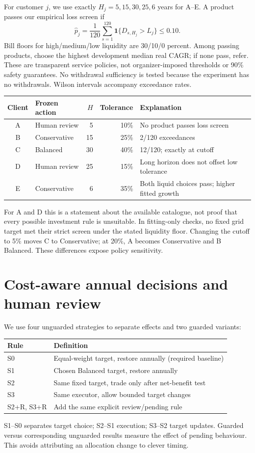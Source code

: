 \documentclass[11pt,a4paper]{article}
\begin{document}
For customer $j$, we use exactly $H_j=5,15,30,25,6$ years for A--E. A product
passes our empirical loss screen if
\begin{equation}
 \widehat p_j=\frac{1}{120}\sum_{s=1}^{120}
 \mathbf1\{D_{s,H_j}>L_j\}\leq0.10.
\end{equation}
Bill floors for high/medium/low liquidity are 30/10/0 percent. Among passing
products, choose the highest development median real CAGR; if none pass, refer.
These are transparent service policies, not organizer-imposed thresholds or
90\% safety guarantees. No withdrawal sufficiency is tested because the
experiment has no withdrawals. Wilson intervals accompany exceedance rates.

\begin{center}
\begin{tabular}{clrrl}
\toprule
Client & Frozen action & $H$ & Tolerance & Explanation\\\midrule
A & Human review & 5 & 10\% & No product passes loss screen\\
B & Conservative & 15 & 25\% & 2/120 exceedances\\
C & Balanced & 30 & 40\% & 12/120; exactly at cutoff\\
D & Human review & 25 & 15\% & Long horizon does not offset low tolerance\\
E & Conservative & 6 & 35\% & Both liquid choices pass; higher fitted growth\\\bottomrule
\end{tabular}
\end{center}
For A and D this is a statement about the available catalogue, not proof that
every possible investment rule is unsuitable. In fitting-only checks, no
fixed grid target met their strict screen under the stated liquidity floor.
Changing the cutoff to 5\% moves C to Conservative; at 20\%, A becomes
Conservative and B Balanced. These differences expose policy sensitivity.

\newpage
\section{Cost-aware annual decisions and human review}
We use four unguarded strategies to separate effects and two guarded variants:
\begin{center}
\begin{tabular}{ll}
\toprule
Rule & Definition\\\midrule
S0 & Equal-weight target, restore annually (required baseline)\\
S1 & Chosen Balanced target, restore annually\\
S2 & Same fixed target, trade only after net-benefit test\\
S3 & Same executor, allow bounded target changes\\
S2+R, S3+R & Add the same explicit review/pending rule\\\bottomrule
\end{tabular}
\end{center}
S1--S0 separates target choice; S2--S1 execution; S3--S2 target updates.
Guarded versus corresponding unguarded results measure the effect of pending
behaviour. This avoids attributing an allocation change to clever timing.
\end{document}
